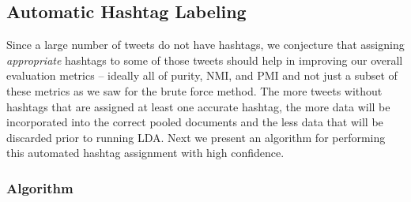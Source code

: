 \documentclass[10pt,a5paper,twoside]{article}
\begin{document}
\subsection{Automatic Hashtag Labeling}

\label{subsec:assign_hashtags}

Since a large number of tweets do not have hashtags, we conjecture
that assigning \emph{appropriate} hashtags to some of those tweets
should help in improving our overall evaluation metrics -- ideally all
of purity, NMI, and PMI and not just a subset of these metrics as we
saw for the brute force method.  The more tweets without hashtags that
are assigned at least one accurate hashtag, the more data will be
incorporated into the correct pooled documents and the less data that
will be discarded prior to running LDA.  Next we present an algorithm
for performing this automated hashtag assignment with high confidence.

\subsubsection{Algorithm}
\end{document}
